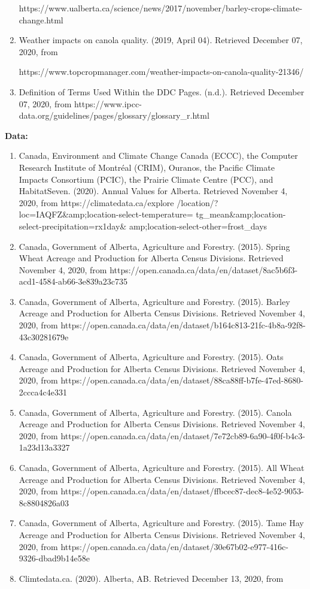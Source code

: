 \documentclass[fontsize=11pt]{article}
\begin{document}
\begin{enumerate}
    https://www.ualberta.ca/science/news/2017/november/barley-crops-climate-change.html
    \item Weather impacts on canola quality. (2019, April 04). Retrieved December 07, 2020, from
    
    https://www.topcropmanager.com/weather-impacts-on-canola-quality-21346/
    \item Definition of Terms Used Within the DDC Pages. (n.d.). Retrieved December 07, 2020, from https://www.ipcc-data.org/guidelines/pages/glossary/glossary\_r.html
\end{enumerate}

\textbf{Data:}\\


\begin{enumerate}
    \item Canada, Environment and Climate Change Canada (ECCC), the Computer Research Institute of Montréal (CRIM), Ouranos, the Pacific Climate Impacts Consortium (PCIC), the Prairie Climate Centre (PCC), and HabitatSeven. (2020). Annual Values for Alberta. Retrieved November 4, 2020, from https://climatedata.ca/explore
    /location/?loc=IAQFZ{\&}amp;location-select-temperature=
    tg\_mean{\&}amp;location-select-precipitation=rx1day{\&}
    amp;location-select-other=frost\_days
    
    \item Canada, Government of Alberta, Agriculture and Forestry. (2015). Spring Wheat Acreage and Production for Alberta Census Divisions. Retrieved November 4, 2020, from https://open.canada.ca/data/en/dataset/8ac5b6f3-acd1-4584-ab66-3e839a23c735
    \item Canada, Government of Alberta, Agriculture and Forestry. (2015). Barley  Acreage and Production for Alberta Census Divisions. Retrieved November 4, 2020, from https://open.canada.ca/data/en/dataset/b164c813-21fc-4b8a-92f8-43c30281679e
    \item Canada, Government of Alberta, Agriculture and Forestry. (2015). Oats  Acreage and Production for Alberta Census Divisions. Retrieved November 4, 2020, from https://open.canada.ca/data/en/dataset/88ca88ff-b7fe-47ed-8680-2ccca4c4e331
    \item Canada, Government of Alberta, Agriculture and Forestry. (2015). Canola  Acreage and Production for Alberta Census Divisions. Retrieved November 4, 2020, from https://open.canada.ca/data/en/dataset/7e72cb89-6a90-4f0f-b4c3-1a23d13a3327
    \item Canada, Government of Alberta, Agriculture and Forestry. (2015). All Wheat  Acreage and Production for Alberta Census Divisions. Retrieved November 4, 2020, from https://open.canada.ca/data/en/dataset/ffbcec87-dec8-4e52-9053-8c8804826a03
    \item Canada, Government of Alberta, Agriculture and Forestry. (2015). Tame Hay  Acreage and Production for Alberta Census Divisions. Retrieved November 4, 2020, from https://open.canada.ca/data/en/dataset/30e67b02-e977-416c-9326-dbad9b14e58e
    \item Climtedata.ca. (2020). Alberta, AB. Retrieved December 13, 2020, from 
    

\end{enumerate}
\end{document}
